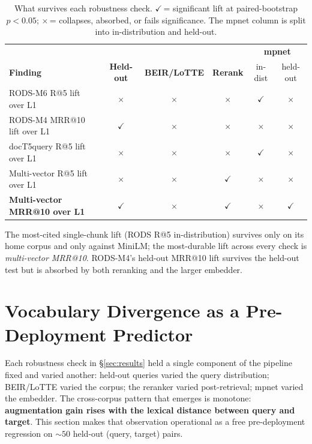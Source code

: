 \documentclass[11pt]{article}
\newcommand{\cmark}{\textcolor{bestcolor}{$\checkmark$}}
\newcommand{\xmark}{$\times$}
\begin{document}
\begin{table}[H]
\centering
\caption{What survives each robustness check.
  \cmark{}\,= significant lift at paired-bootstrap $p<0.05$;
  \xmark{}\,= collapses, absorbed, or fails significance. The mpnet
  column is split into in-distribution and held-out.}
\label{tab:survival}
\small
\begin{tabular}{lccccc}
\toprule
                                    &                   &                       &                  & \multicolumn{2}{c}{\textbf{mpnet}} \\
\textbf{Finding}                    & \textbf{Held-out} & \textbf{BEIR/LoTTE}   & \textbf{Rerank}  & in-dist & held-out \\
\midrule
RODS-M6 R@5 lift over L1            & \xmark            & \xmark                & \xmark           & \cmark  & \xmark   \\
RODS-M4 MRR@10 lift over L1         & \cmark            & \xmark                & \xmark           & \xmark  & \xmark   \\
docT5query R@5 lift over L1         & \xmark            & \xmark                & \xmark           & \cmark  & \xmark   \\
Multi-vector R@5 lift over L1       & \xmark            & \xmark                & \cmark           & \xmark  & \xmark   \\
\textbf{Multi-vector MRR@10 over L1}& \cmark            & \xmark                & \cmark           & \xmark  & \cmark   \\
\bottomrule
\end{tabular}
\end{table}

\noindent
The most-cited single-chunk lift (RODS R@5 in-distribution) survives
only on its home corpus and only against MiniLM; the most-durable
lift across every check is \emph{multi-vector MRR@10}. RODS-M4's
held-out MRR@10 lift survives the held-out test but is absorbed by
both reranking and the larger embedder.

\section{Vocabulary Divergence as a Pre-Deployment Predictor}
\label{sec:divergence}

Each robustness check in \S\ref{sec:results} held a single component
of the pipeline fixed and varied another: held-out queries varied the
query distribution; BEIR/LoTTE varied the corpus; the reranker varied
post-retrieval; mpnet varied the embedder. The cross-corpus pattern
that emerges is monotone: \textbf{augmentation gain rises with the
lexical distance between query and target}. This section makes that
observation operational as a free pre-deployment regression on $\sim
50$ held-out (query, target) pairs.
\end{document}
